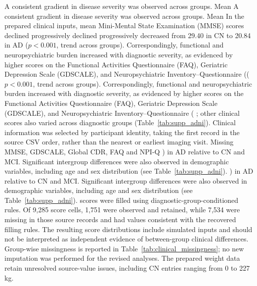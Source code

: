 \documentclass{article}
\providecommand{\DIFaddtex}[1]{{\protect\color{blue} \sf #1}} %
\providecommand{\DIFdeltex}[1]{{\protect\color{red} \ifmmode #1\else\scriptsize #1\fi}} %
\providecommand{\DIFaddbegin}{} %
\providecommand{\DIFaddend}{} %
\providecommand{\DIFdelbegin}{} %
\providecommand{\DIFdelend}{} %
\providecommand{\DIFadd}[1]{\texorpdfstring{\DIFaddtex{#1}}{#1}} %
\providecommand{\DIFdel}[1]{\texorpdfstring{\DIFdeltex{#1}}{}} %
\newcommand{\DIFscaledelfig}{0.5}
\newlength{\DIFdelgraphicswidth} %
\newlength{\DIFdelgraphicsheight} %
\newcommand{\DIFaddincludegraphics}[2][]{{\color{blue}\fbox{\DIFOincludegraphics[#1]{#2}}}} %
\newcommand{\DIFdelincludegraphics}[2][]{%
\sbox{\DIFdelgraphicsbox}{\DIFOincludegraphics[#1]{#2}}%
\settoboxwidth{\DIFdelgraphicswidth}{\DIFdelgraphicsbox} %
\settoboxtotalheight{\DIFdelgraphicsheight}{\DIFdelgraphicsbox} %
\scalebox{\DIFscaledelfig}{%
\parbox[b]{\DIFdelgraphicswidth}{\usebox{\DIFdelgraphicsbox}\\[-\baselineskip] \rule{\DIFdelgraphicswidth}{0em}}\llap{\resizebox{\DIFdelgraphicswidth}{\DIFdelgraphicsheight}{%
\setlength{\unitlength}{\DIFdelgraphicswidth}%
\begin{picture}(1,1)%
\thicklines\linethickness{2pt} %
{\color[rgb]{1,0,0}\put(0,0){\framebox(1,1){}}}%
{\color[rgb]{1,0,0}\put(0,0){\line( 1,1){1}}}%
{\color[rgb]{1,0,0}\put(0,1){\line(1,-1){1}}}%
\end{picture}%
}\hspace*{3pt}}} %
} %
\DeclareRobustCommand{\DIFaddbegin}{\DIFOaddbegin \let\includegraphics\DIFaddincludegraphics} %
\DeclareRobustCommand{\DIFaddend}{\DIFOaddend \let\includegraphics\DIFOincludegraphics} %
\DeclareRobustCommand{\DIFdelbegin}{\DIFOdelbegin \let\includegraphics\DIFdelincludegraphics} %
\DeclareRobustCommand{\DIFdelend}{\DIFOaddend \let\includegraphics\DIFOincludegraphics} %
\begin{document}
\DIFdelbegin \DIFdel{A consistent gradient in disease severity was observed across groups. Mean }\DIFdelend \DIFaddbegin \DIFadd{In the prepared clinical inputs, mean }\DIFaddend Mini-Mental State Examination (MMSE) scores \DIFdelbegin \DIFdel{declined progressively }\DIFdelend \DIFaddbegin \DIFadd{decreased }\DIFaddend from 29.40 in CN to 20.84 in AD\DIFdelbegin \DIFdel{($p < 0.001$, trend across groups). Correspondingly, functional and neuropsychiatric burden increased with diagnostic severity, as evidenced by higher scores on the Functional Activities Questionnaire (FAQ), Geriatric Depression Scale (GDSCALE), and Neuropsychiatric Inventory–Questionnaire (}\DIFdelend \DIFaddbegin \DIFadd{; other clinical scores also varied across diagnostic groups (Table~\ref{tab:supp_adni}). Clinical information was selected by participant identity, taking the first record in the source CSV order, rather than the nearest or earliest imaging visit. Missing MMSE, GDSCALE, Global CDR, FAQ and }\DIFaddend NPI-Q \DIFdelbegin \DIFdel{) in AD relative to CN and MCI. Significant intergroup differences were also observed in demographic variables, including age and sex distribution (see Table~\ref{tab:supp_adni}).
}\DIFdelend \DIFaddbegin \DIFadd{scores were filled using diagnostic-group-conditioned rules. Of 9,285 score cells, 1,751 were observed and retained, while 7,534 were missing in those source records and had values consistent with the recovered filling rules. The resulting score distributions include simulated inputs and should not be interpreted as independent evidence of between-group clinical differences. Group-wise missingness is reported in Table~\ref{tab:clinical_missingness}; no new imputation was performed for the revised analyses. The prepared weight data retain unresolved source-value issues, including CN entries ranging from 0 to 227 kg.
}\DIFaddend 
\end{document}
